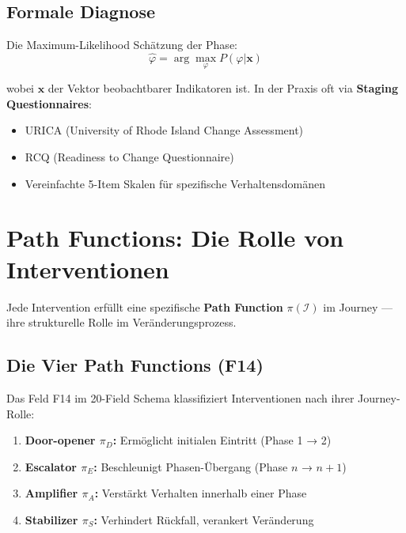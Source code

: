 \subsection{Formale Diagnose}

Die Maximum-Likelihood Schätzung der Phase:
\begin{equation}
\hat{\varphi} = \arg\max_{\varphi} P(\varphi | \mathbf{x})
\label{eq:18-phase-mle}
\end{equation}

wobei $\mathbf{x}$ der Vektor beobachtbarer Indikatoren ist. In der Praxis oft via \textbf{Staging Questionnaires}:
\begin{itemize}
\item URICA (University of Rhode Island Change Assessment)
\item RCQ (Readiness to Change Questionnaire)
\item Vereinfachte 5-Item Skalen für spezifische Verhaltensdomänen
\end{itemize}


\section{Path Functions: Die Rolle von Interventionen}
\label{sec:18-path}

Jede Intervention erfüllt eine spezifische \textbf{Path Function} $\pi(\mathcal{I})$ im Journey --- ihre strukturelle Rolle im Veränderungsprozess.

\subsection{Die Vier Path Functions (F14)}

\begin{definition}
\label{def:18-path-functions}
Das Feld F14 im 20-Field Schema klassifiziert Interventionen nach ihrer Journey-Rolle:
\begin{enumerate}
\item \textbf{Door-opener $\pi_D$:} Ermöglicht initialen Eintritt (Phase 1 → 2)
\item \textbf{Escalator $\pi_E$:} Beschleunigt Phasen-Übergang (Phase $n$ → $n+1$)
\item \textbf{Amplifier $\pi_A$:} Verstärkt Verhalten innerhalb einer Phase
\item \textbf{Stabilizer $\pi_S$:} Verhindert Rückfall, verankert Veränderung
\end{enumerate}
\end{definition}

